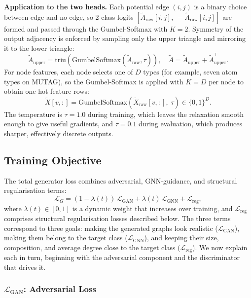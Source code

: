 \documentclass[12pt,a4paper]{article}
\begin{document}
\textbf{Application to the two heads.} Each potential edge $(i,j)$ is a binary choice between edge and no-edge, so 2-class logits $[\tilde{A}_{\text{raw}}[i,j],\; -\tilde{A}_{\text{raw}}[i,j]]$ are formed and passed through the Gumbel-Softmax with $K = 2$. Symmetry of the output adjacency is enforced by sampling only the upper triangle and mirroring it to the lower triangle:
\begin{equation}
  \tilde{A}_{\text{upper}} = \text{triu}(\text{GumbelSoftmax}(\tilde{A}_{\text{raw}}, \tau)), \quad
  \tilde{A} = \tilde{A}_{\text{upper}} + \tilde{A}_{\text{upper}}^\top.
  \label{eq:adj-symmetry}
\end{equation}
For node features, each node selects one of $D$ types (for example, seven atom types on MUTAG), so the Gumbel-Softmax is applied with $K = D$ per node to obtain one-hot feature rows:
\begin{equation}
  \tilde{X}[v,:] = \text{GumbelSoftmax}(\tilde{X}_{\text{raw}}[v,:],\; \tau) \in \{0,1\}^D.
  \label{eq:feat-gumbel}
\end{equation}
The temperature is $\tau = 1.0$ during training, which leaves the relaxation smooth enough to give useful gradients, and $\tau = 0.1$ during evaluation, which produces sharper, effectively discrete outputs.

\subsection{Training Objective}
\label{sec:training}

The total generator loss combines adversarial, GNN-guidance, and structural regularisation terms:
\begin{equation}
  \mathcal{L}_G = (1 - \lambda(t))\,\mathcal{L}_{\text{GAN}} + \lambda(t)\,\mathcal{L}_{\text{GNN}} + \mathcal{L}_{\text{reg}},
  \label{eq:total-loss}
\end{equation}
where $\lambda(t) \in [0, 1]$ is a dynamic weight that increases over training, and $\mathcal{L}_{\text{reg}}$ comprises structural regularisation losses described below. The three terms correspond to three goals: making the generated graphs look realistic ($\mathcal{L}_{\text{GAN}}$), making them belong to the target class ($\mathcal{L}_{\text{GNN}}$), and keeping their size, composition, and average degree close to the target class ($\mathcal{L}_{\text{reg}}$). We now explain each in turn, beginning with the adversarial component and the discriminator that drives it.

\subsubsection{$\mathcal{L}_{\text{GAN}}$: Adversarial Loss}
\end{document}
